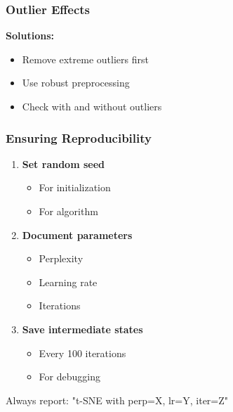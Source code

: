 \documentclass[aspectratio=169]{beamer}
\begin{document}
\begin{frame}
\frametitle{Outlier Effects}

\begin{center}
\end{center}

\textbf{Solutions:}
\begin{itemize}
\item Remove extreme outliers first
\item Use robust preprocessing
\item Check with and without outliers
\end{itemize}

\end{frame}

\begin{frame}
\frametitle{Ensuring Reproducibility}

\begin{enumerate}
\item \textbf{Set random seed}
\begin{itemize}
\item For initialization
\item For algorithm
\end{itemize}

\item \textbf{Document parameters}
\begin{itemize}
\item Perplexity
\item Learning rate
\item Iterations
\end{itemize}

\item \textbf{Save intermediate states}
\begin{itemize}
\item Every 100 iterations
\item For debugging
\end{itemize}
\end{enumerate}

\colorbox{green!20}{Always report: "t-SNE with perp=X, lr=Y, iter=Z"}

\end{frame}
\end{document}
